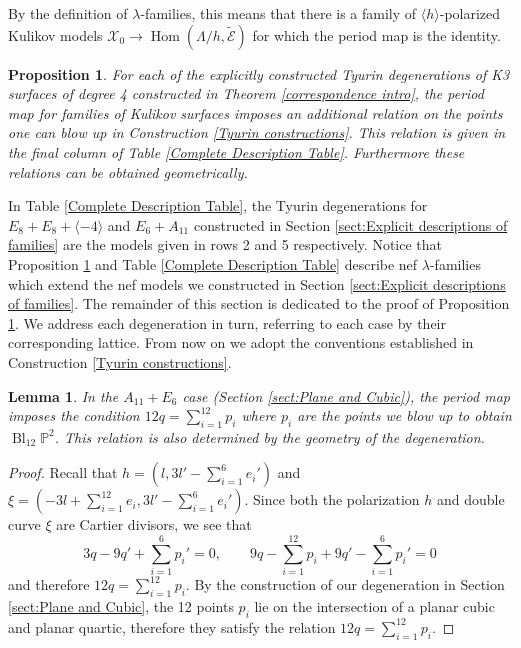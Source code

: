 \documentclass[a4paper]{amsart}
\theoremstyle{definition}
\theoremstyle{plain}
\newtheorem{lemma}[defn]{Lemma}
\newtheorem{prop}[defn]{Proposition}
\theoremstyle{remark}
\newcommand{\PS}{\mathbb{P}}
\begin{document}
By the definition of $\lambda$-families, this means that there is a family of $\langle h \rangle$-polarized Kulikov models $\mathcal{X}_0\rightarrow \operatorname{Hom}(\Lambda/h, \widetilde{\mathcal{E}})$ for which the period map is the identity.

\begin{prop}\label{prop:relations}
For each of the explicitly constructed Tyurin degenerations of K3 surfaces of degree 4 constructed in Theorem \ref{correspondence intro}, the period map for families of Kulikov surfaces imposes an additional relation on the points one can blow up in Construction \ref{Tyurin constructions}. This relation is given in the final column of Table \ref{Complete Description Table}. Furthermore these relations can be obtained geometrically.
\end{prop}

In Table \ref{Complete Description Table}, the Tyurin degenerations for $E_8+E_8+\langle -4 \rangle$ and $E_6+A_{11}$ constructed in Section \ref{sect:Explicit descriptions of families} are the models given in rows 2 and 5 respectively. Notice that Proposition \ref{prop:relations} and Table \ref{Complete Description Table} describe nef $\lambda$-families which extend the nef models we constructed in Section \ref{sect:Explicit descriptions of families}. The remainder of this section is dedicated to the proof of Proposition \ref{prop:relations}. We address each degeneration in turn, referring to each case by their corresponding lattice. From now on we adopt the conventions established in Construction \ref{Tyurin constructions}.

\begin{lemma}
In the $A_{11}+E_6$ case (Section \ref{sect:Plane and Cubic}), the period map imposes the condition $12q = \sum_{i=1}^{12}p_i$ where $p_i$ are the points we blow up to obtain $\operatorname{Bl}_{12}\PS^2$. This relation is also determined by the geometry of the degeneration.
\end{lemma}

\begin{proof}
Recall that $h=(l,3l'-\sum_{i=1}^6e_i')$ and $\xi=(-3l+\sum_{i=1}^{12}e_i,3l'-\sum_{i=1}^6e_i')$. Since both the polarization $h$ and double curve $\xi$ are Cartier divisors, we see that $$3q-9q'+\sum_{i=1}^6p_i' = 0, \qquad 9q-\sum_{i=1}^{12}p_i+9q' -\sum_{i=1}^6p_i' = 0$$
and therefore $12q=\sum_{i=1}^{12}p_i$. By the construction of our degeneration in Section \ref{sect:Plane and Cubic}, the 12 points $p_i$ lie on the intersection of a planar cubic and planar quartic, therefore they satisfy the relation $12q=\sum_{i=1}^{12}p_i$.
\end{proof}
\end{document}
